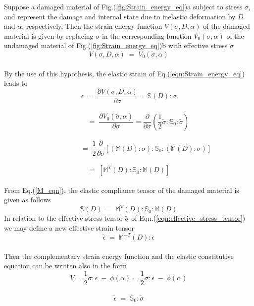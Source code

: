 \documentclass[a4paper,14pt]{extarticle}
\begin{document}
Suppose a damaged material of Fig.(\ref{fig:Strain_energy_eq})a subject to stress $\sigma$, and represent the damage and internal state due to inelastic deformation by $D$ and $\alpha$, respectively. Then the strain energy function $V(\sigma,D,\alpha)$ of the damaged material is given by replacing $\sigma$ in the corresponding function $V_{0}(\sigma,\alpha)$ of the undamaged material of Fig.(\ref{fig:Strain_energy_eq})b with effective stress $\tilde{\sigma}$
\\
\begin{equation*}
V(\sigma,D,\alpha) \; = \; V_{0}(\tilde{\sigma},\alpha)
\end{equation*}
\\
By the use of this hypothesis, the elastic strain of Eq.(\ref{eqn:Strain_energy_eq}) leads to
\\
\begin{equation*}
\epsilon \; = \; \frac{\partial V(\sigma,D,\alpha)}{\partial \sigma} = \mathbb{S}(D) : \sigma 
\end{equation*}
\\
\begin{equation*}
\;\;\;\;\;\;\;\;\;\; = \; \frac{\partial V_{0}(\tilde{\sigma},\alpha)}{\partial \sigma} = \frac{\partial}{\partial \sigma}(\frac{1}{2}\tilde{\sigma} : \mathbb{S}_{0} : \tilde{\sigma} )
\end{equation*}
\\
\begin{equation*}
\;\;\;\;\;\;\;\;\;\;\;\;\;\;\;\;\;\; = \; \frac{1}{2}\frac{\partial}{\partial \sigma} [(\mathbb{M}(D):\sigma) : \mathbb{S}_{0} : (\mathbb{M}(D):\sigma)]
\end{equation*}
\\
\begin{equation}
= \;[\mathbb{M}^{T}(D) : \mathbb{S}_{0} : \mathbb{M}(D)]
\label{M_eqn}
\end{equation}
\\
From Eq.(\ref{M_eqn}), the elastic compliance tensor of the damaged material is given as follows
\\
\begin{equation}
\mathbb{S}(D) \; = \; \mathbb{M}^{T}(D) : \mathbb{S}_{0} : \mathbb{M}(D)
\label{eqn: S_HSEeq}
\end{equation}
In relation to the effective stress tensor $\tilde{\sigma}$ of Eqn.(\ref{eqn:effective_stress_tensor}) we may define a new effective strain tensor
\\
\begin{equation}
\tilde{\epsilon} \; = \; \mathbb{M}^{-T}(D) : \epsilon
\end{equation}
\\
Then the complementary strain energy function and the elastic constitutive equation can be written also in the form
\\
\begin{equation}
V = \frac{1}{2}\sigma : \epsilon \; - \; \phi(\alpha) = \frac{1}{2}\tilde{\sigma} : \tilde{\epsilon} \; - \; \phi(\alpha)
\end{equation}
\\
\begin{equation}
\tilde{\epsilon} \; = \; \mathbb{S}_{0} : \tilde{\sigma}
\end{equation}
\newpage 
\end{document}
